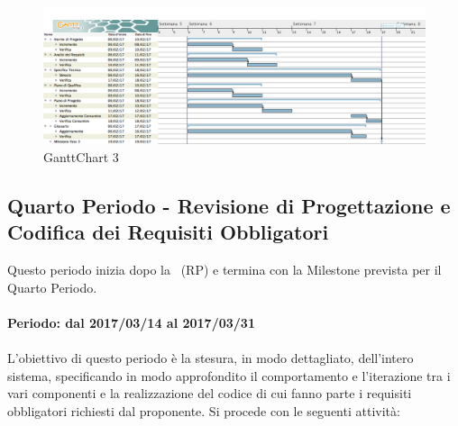 \documentclass[../PianoDiProgetto_v3.0.0.tex]{subfiles}
\begin{document}
	\newpage
	\begin{figure}[!h]
		\centering
		\includegraphics[width=\textwidth]{Pianificazione/Immagini/GanttChart03.png}
		\caption{GanttChart 3}
	\end{figure}	
	
\subsection{Quarto Periodo - Revisione di Progettazione e Codifica dei Requisiti Obbligatori}
	Questo periodo inizia dopo la \revisionediprogettazione\ (RP) e termina con la Milestone prevista per il Quarto Periodo.
	\\
	\\
	\textbf{Periodo: dal 2017/03/14 al 2017/03/31}
	\\
	\\
	L'obiettivo di questo periodo è la stesura, in modo dettagliato, dell'intero sistema, specificando in modo approfondito il comportamento e l'iterazione tra i vari componenti e la realizzazione del codice di cui fanno parte i requisiti obbligatori richiesti dal proponente.
	Si procede con le seguenti attività:
\end{document}
